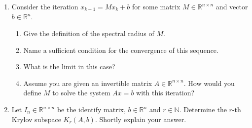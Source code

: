 \vspace*{-0.5cm}
\begin{enumerate}
	\item Consider the iteration $x_{k+1} = Mx_k + b$ for some matrix $M \in \mathbb{R}^{n \times n}$ and vector $b \in \mathbb{R}^n$. 
	\begin{enumerate}
		\item Give the definition of the spectral radius of $M$.
		\item Name a sufficient condition for the convergence of this sequence.
		\item What is the limit in this case? 
		\item Assume you are given an invertible matrix $A \in \mathbb{R}^{n \times n}$. How would you define $M$ to solve the system $Ax=b$ with this iteration?
	\end{enumerate} 
	\item Let $I_n \in \mathbb{R}^{n \times n}$ be the identify matrix, $b\in \mathbb{R}^{n}$ and $r\in \mathbb{N}$. Determine the $r$-th Krylov subspace $K_r(A,b)$. Shortly explain your answer.
\end{enumerate}
 